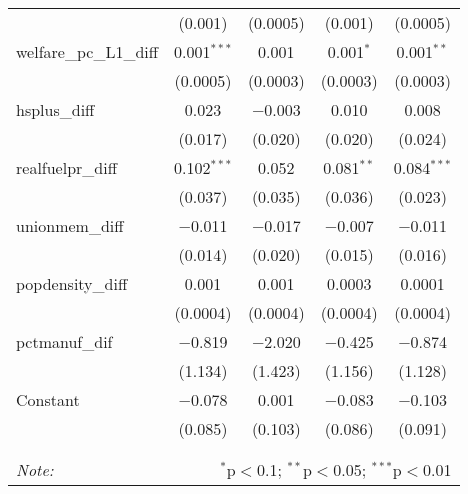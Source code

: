 \begin{table}[!htbp]
\begin{tabular}{@{\extracolsep{5pt}}lcccc}
  & (0.001) & (0.0005) & (0.001) & (0.0005) \\ 
  welfare\_pc\_L1\_diff & 0.001$^{***}$ & 0.001 & 0.001$^{*}$ & 0.001$^{**}$ \\ 
  & (0.0005) & (0.0003) & (0.0003) & (0.0003) \\ 
  hsplus\_diff & 0.023 & $-$0.003 & 0.010 & 0.008 \\ 
  & (0.017) & (0.020) & (0.020) & (0.024) \\ 
  realfuelpr\_diff & 0.102$^{***}$ & 0.052 & 0.081$^{**}$ & 0.084$^{***}$ \\ 
  & (0.037) & (0.035) & (0.036) & (0.023) \\ 
  unionmem\_diff & $-$0.011 & $-$0.017 & $-$0.007 & $-$0.011 \\ 
  & (0.014) & (0.020) & (0.015) & (0.016) \\ 
  popdensity\_diff & 0.001 & 0.001 & 0.0003 & 0.0001 \\ 
  & (0.0004) & (0.0004) & (0.0004) & (0.0004) \\ 
  pctmanuf\_dif & $-$0.819 & $-$2.020 & $-$0.425 & $-$0.874 \\ 
  & (1.134) & (1.423) & (1.156) & (1.128) \\ 
  Constant & $-$0.078 & 0.001 & $-$0.083 & $-$0.103 \\ 
  & (0.085) & (0.103) & (0.086) & (0.091) \\ 
 \hline \\[-1.8ex] 
\hline 
\hline \\[-1.8ex] 
\textit{Note:}  & \multicolumn{4}{r}{$^{*}$p$<$0.1; $^{**}$p$<$0.05; $^{***}$p$<$0.01} \\ 
\end{tabular} 
\end{table} 
